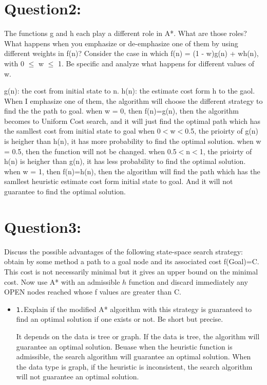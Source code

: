 \documentclass{article}
\begin{document}
\section{Question2:}
The functions g and h each play a different role in A*. What are those roles? What happens when you emphasize or de-emphasize one of them by using different weights in f(n)? Consider the case in which f(n) = (1 - w)g(n) + wh(n), with 0 $\leq$ w $\leq$ 1. Be specific and analyze what happens for different values of w. 

g(n): the cost from initial state to n.\newline {}
h(n): the estimate cost form h to the gaol.\newline
When I emphasize one of them, the algorithm will choose the different strategy to find the
the path to goal.\newline
when w = 0, then f(n)=g(n), then the algorithm becomes to Uniform Cost search, and it will just find the optimal path which has the samllest cost from
initial state to goal \newline
when 0$<$w$<$0.5, the prioirty of g(n) is heigher than h(n), it has more probability to find the optimal solution. \newline
when w = 0.5, then the function will not be changed.\newline
when 0.5$<$n$<$1, the prioirty of h(n) is heigher than g(n), it has less probability to find the optimal solution. \newline
when w = 1, then f(n)=h(n), then the algorithm will find the path which has the samllest heuristic estimate cost form initial state to goal. And it will not guarantee to find the optimal solution.\newline

\section{Question3:}
Discuss the possible advantages of the following state-space search strategy: obtain by some method a path to a goal node and its associated cost f(Goal)=C. This cost is not necessarily minimal but it gives an upper bound on the minimal cost. Now use A* with an admissible $h$ function and discard immediately any OPEN nodes reached whose f values are greater than C.

\begin{itemize}
	\item \texttt{1.}Explain if the modified A* algorithm with this strategy is guaranteed to find an optimal solution if one exists or not. Be short but precise.
    
    It depends on the data is tree or graph. If the data is tree, the algorithm will guarantee an optimal solution.
    Beuase when the heuristic function is admissible, the search algorithm will guarantee an optimal solution.
    When the data type is graph, if the heuristic is inconsistent, the search algorithm will not guarantee an optimal solution.
    
\end{itemize}
\end{document}
